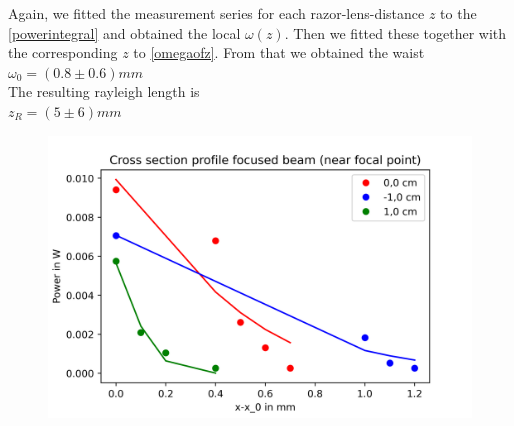 \documentclass{article}
\begin{document}
Again, we fitted the measurement series for each razor-lens-distance $z$ to the \ref{powerintegral} and obtained the local $\omega(z)$. Then we fitted these together with the corresponding $z$ to \ref{omegaofz}.
From that we obtained the waist\\ 
$\omega_{0} = ( 0.8 \pm 0.6 ) mm $\\
The resulting rayleigh length is\\
$z_{R} =  ( 5 \pm 6 ) mm $\\

\begin{figure}[h!]
\includegraphics[width=\textwidth]{Cross section profile focused beam (near focal point).png} 
\label{near_focal} 
\end{figure}
\end{document}
